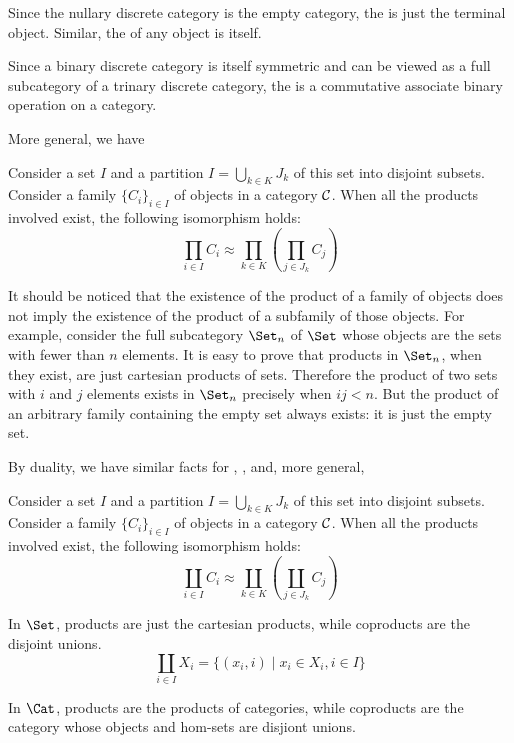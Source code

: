   Since the nullary discrete category is the empty category, the  is just the terminal object. Similar, the  of any object is itself.

  Since a binary discrete category is itself symmetric and can be viewed as a full subcategory of a trinary discrete category, the  is a commutative associate binary operation on a category.

  More general, we have
  \begin{prop}\label{prop:assofprod}
    Consider a set $I$ and a partition $I = \bigcup_{k\in K}J_k$ of this set into disjoint subsets. Consider a family $\{C_i\}_{i\in I}$ of objects in a category ${\cal C}$. When all the products involved exist, the following isomorphism holds:
    \begin{equation*}
      \prod_{i\in I}C_i \approx \prod_{k\in K}(\prod_{j\in J_k}C_j)
    \end{equation*}
  \end{prop}
  \begin{rem}
    It should be noticed that the existence of the product of a family of objects does not imply the existence of the product of a subfamily of those objects. For example, consider the full subcategory $\Set_n$ of $\Set$ whose objects are the sets with fewer than $n$ elements. It is easy to prove that products in $\Set_n$, when they exist, are just cartesian products of sets. Therefore the product of two sets with $i$ and $j$ elements exists in $\Set_n$ precisely when $ij<n$. But the product of an arbitrary family containing the empty set always exists: it is just the empty set.
  \end{rem}

  By duality, we have similar facts for , ,  and, more general,
  \begin{prop}\label{prop:assofcoprod}
    Consider a set $I$ and a partition $I = \bigcup_{k\in K}J_k$ of this set into disjoint subsets. Consider a family $\{C_i\}_{i\in I}$ of objects in a category ${\cal C}$. When all the products involved exist, the following isomorphism holds:
    \begin{equation*}
      \coprod_{i\in I}C_i \approx \coprod_{k\in K}(\coprod_{j\in J_k}C_j)
    \end{equation*}
  \end{prop}

  \begin{exam}
    In $\Set$, products are just the cartesian products, while coproducts are the disjoint unions.
    \begin{equation*}
      \coprod_{i\in I}X_i = \{(x_i,i)\mid x_i\in X_i, i\in I\}
    \end{equation*}
  \end{exam}
  \begin{exam}
    In $\Cat$, products are the products of categories, while coproducts are the category whose objects and hom-sets are disjiont unions.
  \end{exam}


